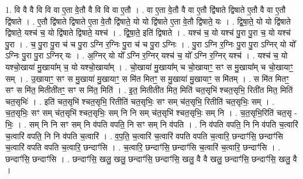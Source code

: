 \documentclass[17pt]{extarticle}
\begin{document}
1. वि वै वै वि वि वा ए॒ता वे॒तौ वै वि वि वा ए॒तौ । . वा ए॒ता वे॒तौ वै वा ए॒तौ द्वि॑षाते द्विषाते ए॒तौ वै वा ए॒तौ द्वि॑षाते । . ए॒तौ द्वि॑षाते द्विषाते ए॒ता वे॒तौ द्वि॑षाते॒ यो यो द्वि॑षाते ए॒ता वे॒तौ द्वि॑षाते॒ यः । . द्वि॒षा॒ते॒ यो यो द्वि॑षाते द्विषाते॒ यश्च॑ च॒ यो द्वि॑षाते द्विषाते॒ यश्च॑ । . द्वि॒षा॒ते॒ इति॑ द्विषाते । . यश्च॑ च॒ यो यश्च॑ पु॒रा पु॒रा च॒ यो यश्च॑ पु॒रा । . च॒ पु॒रा पु॒रा च॑ च पु॒रा ऽग्नि र॒ग्निः पु॒रा च॑ च पु॒रा ऽग्निः । . पु॒रा ऽग्नि र॒ग्निः पु॒रा पु॒रा ऽग्निर् यो यो᳚ ऽग्निः पु॒रा पु॒रा ऽग्निर् यः । . अ॒ग्निर् यो यो᳚ ऽग्नि र॒ग्निर् यश्च॑ च॒ यो᳚ ऽग्नि र॒ग्निर् यश्च॑ । . यश्च॑ च॒ यो यश्चो॒खाया॑ मु॒खाया᳚म् च॒ यो यश्चो॒खाया᳚म् । . चो॒खाया॑ मु॒खाया᳚म् च चो॒खायाꣳ॒॒ सꣳ स मु॒खाया᳚म् च चो॒खायाꣳ॒॒ सम् । . उ॒खायाꣳ॒॒ सꣳ स मु॒खाया॑ मु॒खायाꣳ॒॒ स मि॑त मितꣳ॒॒ स मु॒खाया॑ मु॒खायाꣳ॒॒ स मि॑तम् । . स मि॑त मितꣳ॒॒ सꣳ स मि॑त॒ मितीती॑तꣳ॒॒ सꣳ स मि॑त॒ मिति॑ । . इ॒त॒ मितीती॑त मित॒ मिति॑ चत॒सृभि॑ श्चत॒सृभि॒ रिती॑त मित॒ मिति॑ चत॒सृभिः॑ । . इति॑ चत॒सृभि॑ श्चत॒सृभि॒ रितीति॑ चत॒सृभिः॒ सꣳ सम् च॑त॒सृभि॒ रितीति॑ चत॒सृभिः॒ सम् । . च॒त॒सृभिः॒ सꣳ सम् च॑त॒सृभि॑ श्चत॒सृभिः॒ सम् नि नि सम् च॑त॒सृभि॑ श्चत॒सृभिः॒ सम् नि । . च॒त॒सृभि॒रिति॑ चत॒सृ - भिः॒ । . सम् नि नि सꣳ सम् नि व॑पति वपति॒ नि सꣳ सम् नि व॑पति । . नि व॑पति वपति॒ नि नि व॑पति च॒त्वारि॑ च॒त्वारि॑ वपति॒ नि नि व॑पति च॒त्वारि॑ । . व॒प॒ति॒ च॒त्वारि॑ च॒त्वारि॑ वपति वपति च॒त्वारि॒ छन्दाꣳ॑सि॒ छन्दाꣳ॑सि च॒त्वारि॑ वपति वपति च॒त्वारि॒ छन्दाꣳ॑सि । . च॒त्वारि॒ छन्दाꣳ॑सि॒ छन्दाꣳ॑सि च॒त्वारि॑ च॒त्वारि॒ छन्दाꣳ॑सि । . छन्दाꣳ॑सि॒ छन्दाꣳ॑सि । . छन्दाꣳ॑सि॒ खलु॒ खलु॒ छन्दाꣳ॑सि॒ छन्दाꣳ॑सि॒ खलु॒ वै वै खलु॒ छन्दाꣳ॑सि॒ छन्दाꣳ॑सि॒ खलु॒ वै । \newline
\end{document}
